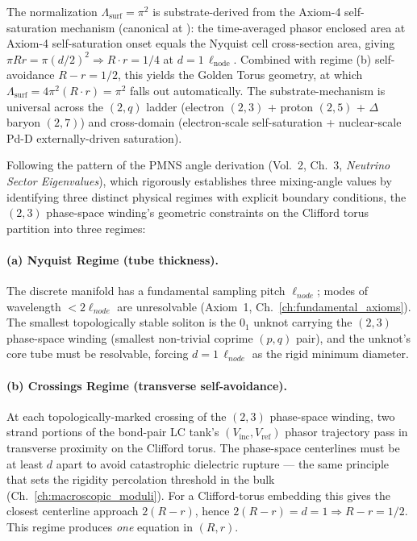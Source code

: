 The normalization $\Lambda_{\text{surf}} = \pi^2$ is substrate-derived from the Axiom-4 self-saturation mechanism (canonical at ): the time-averaged phasor enclosed area at Axiom-4 self-saturation onset equals the Nyquist cell cross-section area, giving $\pi R r = \pi(d/2)^2 \Rightarrow R \cdot r = 1/4$ at $d = 1\,\ell_\text{node}$. Combined with regime (b) self-avoidance $R - r = 1/2$, this yields the Golden Torus geometry, at which $\Lambda_\text{surf} = 4\pi^2(R \cdot r) = \pi^2$ falls out automatically. The substrate-mechanism is universal across the $(2,q)$ ladder (electron $(2,3)$ + proton $(2,5)$ + $\Delta$ baryon $(2,7)$) and cross-domain (electron-scale self-saturation + nuclear-scale Pd-D externally-driven saturation).

Following the pattern of the PMNS angle derivation (Vol.~2, Ch.~3, \textit{Neutrino Sector Eigenvalues}), which rigorously establishes three mixing-angle values by identifying three distinct physical regimes with explicit boundary conditions, the $(2, 3)$ phase-space winding's geometric constraints on the Clifford torus partition into three regimes:

\paragraph{(a) Nyquist Regime (tube thickness).}
The discrete manifold has a fundamental sampling pitch $\ell_{node}$; modes of wavelength $< 2\ell_{node}$ are unresolvable (Axiom~1, Ch.~\ref{ch:fundamental_axioms}). The smallest topologically stable soliton is the $0_1$ unknot carrying the $(2, 3)$ phase-space winding (smallest non-trivial coprime $(p, q)$ pair), and the unknot's core tube must be resolvable, forcing $d = 1\,\ell_{node}$ as the rigid minimum diameter.

\paragraph{(b) Crossings Regime (transverse self-avoidance).}
At each topologically-marked crossing of the $(2, 3)$ phase-space winding, two strand portions of the bond-pair LC tank's $(V_{\text{inc}}, V_{\text{ref}})$ phasor trajectory pass in transverse proximity on the Clifford torus. The phase-space centerlines must be at least $d$ apart to avoid catastrophic dielectric rupture --- the same principle that sets the rigidity percolation threshold in the bulk (Ch.~\ref{ch:macroscopic_moduli}). For a Clifford-torus embedding this gives the closest centerline approach $2(R-r)$, hence $2(R-r) = d = 1 \Rightarrow R - r = 1/2$. This regime produces \emph{one} equation in $(R, r)$.

